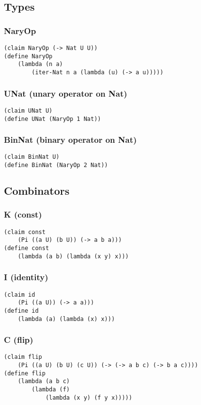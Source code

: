 \subsection{Types}

\subsubsection{NaryOp}
\begin{verbatim}
(claim NaryOp (-> Nat U U))
(define NaryOp
    (lambda (n a)
        (iter-Nat n a (lambda (u) (-> a u)))))
\end{verbatim}

\subsubsection{UNat (unary operator on Nat)}
\begin{verbatim}
(claim UNat U)
(define UNat (NaryOp 1 Nat))
\end{verbatim}

\subsubsection{BinNat (binary operator on Nat)}
\begin{verbatim}
(claim BinNat U)
(define BinNat (NaryOp 2 Nat))
\end{verbatim}


\subsection{Combinators}

\subsubsection{K (const)}
\begin{verbatim}
(claim const
    (Pi ((a U) (b U)) (-> a b a)))
(define const
    (lambda (a b) (lambda (x y) x)))
\end{verbatim}

\subsubsection{I (identity)}
\begin{verbatim}
(claim id 
    (Pi ((a U)) (-> a a)))
(define id
    (lambda (a) (lambda (x) x)))
\end{verbatim}

\subsubsection{C (flip)}
\begin{verbatim}
(claim flip
    (Pi ((a U) (b U) (c U)) (-> (-> a b c) (-> b a c))))
(define flip
    (lambda (a b c)
        (lambda (f)
            (lambda (x y) (f y x)))))
\end{verbatim}

